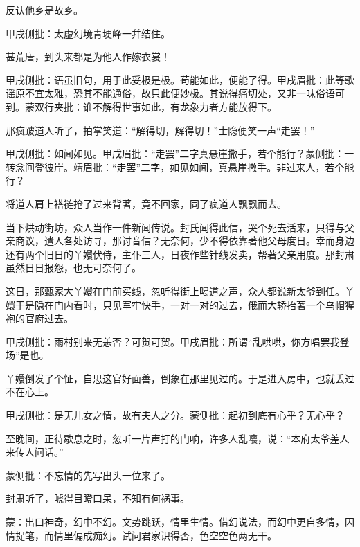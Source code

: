 \begin{poem}
    \begin{pl}
        反认他乡是故乡。\end{pl}\begin{note}甲戌侧批：太虚幻境青埂峰一幷结住。\end{note}

    \begin{pl}
        甚荒唐，到头来都是为他人作嫁衣裳！\end{pl}\begin{note}甲戌侧批：语虽旧句，用于此妥极是极。苟能如此，便能了得。甲戌眉批：此等歌谣原不宜太雅，恐其不能通俗，故只此便妙极。其说得痛切处，又非一味俗语可到。蒙双行夹批：谁不解得世事如此，有龙象力者方能放得下。\end{note}
\end{poem}

\begin{parag}
    那疯跛道人听了，拍掌笑道：“解得切，解得切！”士隐便笑一声“走罢！”\begin{note}甲戌侧批：如闻如见。甲戌眉批：“走罢”二字真悬崖撒手，若个能行？蒙侧批：一转念间登彼岸。靖眉批：“走罢”二字，如见如闻，真悬崖撒手。非过来人，若个能行？\end{note}将道人肩上褡裢抢了过来背著，竟不回家，同了疯道人飘飘而去。
\end{parag}


\begin{parag}
    当下烘动街坊，众人当作一件新闻传说。封氏闻得此信，哭个死去活来，只得与父亲商议，遣人各处访寻，那讨音信？无奈何，少不得依靠著他父母度日。幸而身边还有两个旧日的丫嬛伏侍，主仆三人，日夜作些针线发卖，帮著父亲用度。那封肃虽然日日报怨，也无可奈何了。
\end{parag}


\begin{parag}
    这日，那甄家大丫嬛在门前买线，忽听得街上喝道之声，众人都说新太爷到任。丫嬛于是隐在门内看时，只见军牢快手，一对一对的过去，俄而大轿抬著一个乌帽猩袍的官府过去。\begin{note}甲戌侧批：雨村别来无恙否？可贺可贺。甲戌眉批：所谓“乱哄哄，你方唱罢我登场”是也。\end{note}丫嬛倒发了个怔，自思这官好面善，倒象在那里见过的。于是进入房中，也就丢过不在心上。\begin{note}甲戌侧批：是无儿女之情，故有夫人之分。蒙侧批：起初到底有心乎？无心乎？\end{note}至晚间，正待歇息之时，忽听一片声打的门响，许多人乱嚷，说：“本府太爷差人来传人问话。”\begin{note}蒙侧批：不忘情的先写出头一位来了。\end{note}封肃听了，唬得目瞪口呆，不知有何祸事。
\end{parag}


\begin{parag}
    \begin{note}蒙：出口神奇，幻中不幻。文势跳跃，情里生情。借幻说法，而幻中更自多情，因情捉笔，而情里偏成痴幻。试问君家识得否，色空空色两无干。\end{note}
\end{parag}

